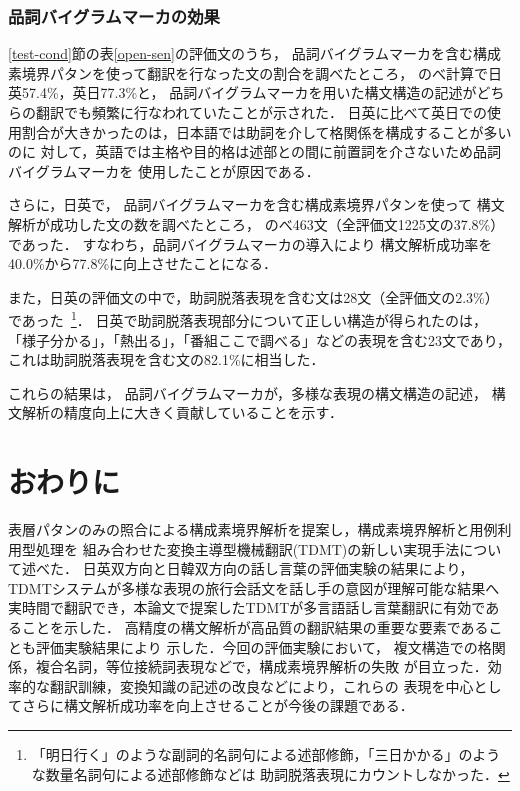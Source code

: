 \vspace*{-3mm}
\subsubsection{品詞バイグラムマーカの効果}

\ref{test-cond}節の表\ref{open-sen}の評価文のうち，
品詞バイグラムマーカを含む構成素境界パタンを使って翻訳を行なった文の割合を調べたところ，
のべ計算で日英57.4\%，英日77.3\%と，
品詞バイグラムマーカを用いた構文構造の記述がどちらの翻訳でも頻繁に行なわれていたことが示された．
日英に比べて英日での使用割合が大きかったのは，日本語では助詞を介して格関係を構成することが多いのに
対して，英語では主格や目的格は述部との間に前置詞を介さないため品詞バイグラムマーカを
使用したことが原因である．

さらに，日英で，
品詞バイグラムマーカを含む構成素境界パタンを使って
構文解析が成功した文の数を調べたところ，
のべ463文（全評価文1225文の37.8\%）であった．
すなわち，品詞バイグラムマーカの導入により
構文解析成功率を40.0\%から77.8\%に向上させたことになる．

また，日英の評価文の中で，助詞脱落表現を含む文は28文（全評価文の2.3\%）であった~\footnote{
「明日行く」のような副詞的名詞句による述部修飾，「三日かかる」のような数量名詞句による述部修飾などは
助詞脱落表現にカウントしなかった．}．
日英で助詞脱落表現部分について正しい構造が得られたのは，
「様子分かる」，「熱出る」，「番組ここで調べる」などの表現を含む23文であり，
これは助詞脱落表現を含む文の82.1\%に相当した．

これらの結果は，
品詞バイグラムマーカが，多様な表現の構文構造の記述，
構文解析の精度向上に大きく貢献していることを示す．

\section{おわりに}

表層パタンのみの照合による構成素境界解析を提案し，構成素境界解析と用例利用型処理を
組み合わせた変換主導型機械翻訳(TDMT)の新しい実現手法について述べた．
日英双方向と日韓双方向の話し言葉の評価実験の結果により，
TDMTシステムが多様な表現の旅行会話文を話し手の意図が理解可能な結果へ
実時間で翻訳でき，本論文で提案したTDMTが多言語話し言葉翻訳に有効であることを示した．
高精度の構文解析が高品質の翻訳結果の重要な要素であることも評価実験結果により
示した．今回の評価実験において，
複文構造での格関係，複合名詞，等位接続詞表現などで，構成素境界解析の失敗
が目立った．効率的な翻訳訓練，変換知識の記述の改良などにより，これらの
表現を中心としてさらに構文解析成功率を向上させることが今後の課題である．


